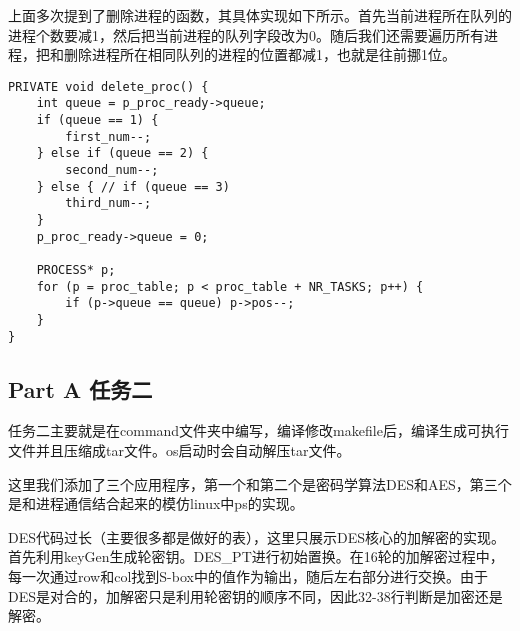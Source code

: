 \documentclass{whureport}
\begin{document}
上面多次提到了删除进程的函数，其具体实现如下所示。首先当前进程所在队列的进程个数要减1，然后把当前进程的队列字段改为0。随后我们还需要遍历所有进程，把和删除进程所在相同队列的进程的位置都减1，也就是往前挪1位。

\begin{lstlisting}
PRIVATE void delete_proc() {
	int queue = p_proc_ready->queue;
	if (queue == 1) {
		first_num--;
	} else if (queue == 2) {
		second_num--;
	} else { // if (queue == 3)
		third_num--;
	}
	p_proc_ready->queue = 0;

	PROCESS* p;
	for (p = proc_table; p < proc_table + NR_TASKS; p++) {
		if (p->queue == queue) p->pos--;
	}
}
\end{lstlisting}

\subsection{Part A 任务二}
任务二主要就是在command文件夹中编写，编译修改makefile后，编译生成可执行文件并且压缩成tar文件。os启动时会自动解压tar文件。

这里我们添加了三个应用程序，第一个和第二个是密码学算法DES和AES，第三个是和进程通信结合起来的模仿linux中ps的实现。

DES代码过长（主要很多都是做好的表），这里只展示DES核心的加解密的实现。首先利用keyGen生成轮密钥。DES\_PT进行初始置换。在16轮的加解密过程中，每一次通过row和col找到S-box中的值作为输出，随后左右部分进行交换。由于DES是对合的，加解密只是利用轮密钥的顺序不同，因此32-38行判断是加密还是解密。
\end{document}
